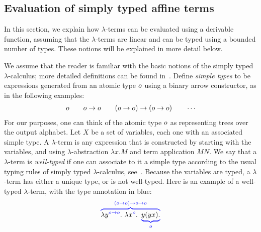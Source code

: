 \subsection{Evaluation of simply typed affine terms}
\label{sec:one-register}

In this section, we explain how $\lambda$-terms can be evaluated using a derivable function, assuming that the $\lambda$-terms are linear and  can be typed using a bounded number of types. These notions will be explained in more detail below.  



We assume that the reader is familiar with the basic notions of the simply typed $\lambda$-calculus; more detailed definitions can be found in~\cite{sorensen_lectures_2006}. 
Define  \emph{simple types} to be expressions  generated from an atomic type $o$ using a binary arrow constructor, as in the following examples:
\begin{align*}
    o \qquad o \to o \qquad (o \to o) \to (o \to o) \qquad \cdots 
\end{align*}
For our purposes, one can think of the atomic type $o$ as representing trees over the output alphabet.
Let $X$ be a set of variables, each one with an associated simple type.  A $\lambda$-term  is any expression that is constructed by starting with the variables, and using $\lambda$-abstraction $\lambda x. M$ and term application $M N$. 
We say that a $\lambda$-term is \emph{well-typed} if one can associate  to it  a simple type according to the usual typing rules of simply typed $\lambda$-calculus,
see~\cite[Definition 3.2.1]{sorensen_lectures_2006}. Because the variables are typed, a  $\lambda$-term has  either a unique type, or is not well-typed.  Here is an example of a well-typed $\lambda$-term, with the type annotation in blue: 
\begin{align*}
    {\color{blue}\overbrace{
        {\color{black}\lambda {y}^{{\color{blue}o\to o}}. \ \lambda {x}^{{\color{blue}o}}.}  \ \underbrace{{\color{black}y (y x).}}_{o}}^{(o\to o) \to o\to o}}
    \end{align*}

    

